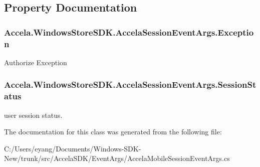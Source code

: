 \subsection{Property Documentation}
\hypertarget{class_accela_1_1_windows_store_s_d_k_1_1_accela_session_event_args_a9297687b238c8562dcd6096586a459c6}{
\subsubsection[{Exception}]{ Accela.\+Windows\+Store\+S\+D\+K.\+Accela\+Session\+Event\+Args.\+Exception\hspace{0.3cm}{\ttfamily [get]}}}\label{class_accela_1_1_windows_store_s_d_k_1_1_accela_session_event_args_a9297687b238c8562dcd6096586a459c6}


Authorize Exception 

\hypertarget{class_accela_1_1_windows_store_s_d_k_1_1_accela_session_event_args_a0a2df1cecbb836f93ff8061ee7b02e2c}{
\subsubsection[{Session\+Status}]{ Accela.\+Windows\+Store\+S\+D\+K.\+Accela\+Session\+Event\+Args.\+Session\+Status\hspace{0.3cm}{\ttfamily [get]}}}\label{class_accela_1_1_windows_store_s_d_k_1_1_accela_session_event_args_a0a2df1cecbb836f93ff8061ee7b02e2c}


user session status. 



The documentation for this class was generated from the following file\+:\begin{DoxyCompactItemize}
\item 
C\+:/\+Users/eyang/\+Documents/\+Windows-\/\+S\+D\+K-\/\+New/trunk/src/\+Accela\+S\+D\+K/\+Event\+Args/Accela\+Mobile\+Session\+Event\+Args.\+cs\end{DoxyCompactItemize}
